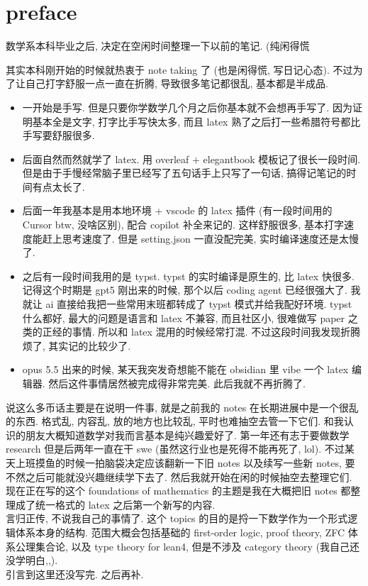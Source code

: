 \chapter*{preface}

数学系本科毕业之后, 决定在空闲时间整理一下以前的笔记. (纯闲得慌

其实本科刚开始的时候就热衷于 note taking 了 (也是闲得慌, 写日记心态). 不过为了让自己打字舒服一点一直在折腾, 导致很多笔记都很乱, 基本都是半成品. 
\begin{itemize}
    \item 一开始是手写. 但是只要你学数学几个月之后你基本就不会想再手写了. 因为证明基本全是文字, 打字比手写快太多, 而且 latex 熟了之后打一些希腊符号都比手写要舒服很多.
    \item 后面自然而然就学了 latex. 用 overleaf + elegantbook 模板记了很长一段时间. 但是由于手慢经常脑子里已经写了五句话手上只写了一句话, 搞得记笔记的时间有点太长了.
    \item 后面一年我基本是用本地环境 + vscode 的 latex 插件 (有一段时间用的 Cursor btw, 没啥区别), 配合 copilot 补全来记的. 这样舒服很多, 基本打字速度能赶上思考速度了. 但是 setting.json 一直没配完美, 实时编译速度还是太慢了. 
    \item 之后有一段时间我用的是 typst. typst 的实时编译是原生的, 比 latex 快很多. 记得这个时期是 gpt5 刚出来的时候, 那个以后 coding agent 已经很强大了. 我就让 ai 直接给我把一些常用末班都转成了 typst 模式并给我配好环境. typst 什么都好, 最大的问题是语言和 latex 不兼容, 而且社区小, 很难做写 paper 之类的正经的事情. 所以和 latex 混用的时候经常打混. 不过这段时间我发现折腾烦了, 其实记的比较少了. 
    \item opus 5.5 出来的时候, 某天我突发奇想能不能在 obsidian 里 vibe 一个 latex 编辑器. 然后这件事情居然被完成得非常完美. 此后我就不再折腾了. 
\end{itemize}
说这么多币话主要是在说明一件事, 就是之前我的 notes 在长期进展中是一个很乱的东西. 格式乱, 内容乱, 放的地方也比较乱, 平时也难抽空去管一下它们. 和我认识的朋友大概知道数学对我而言基本是纯兴趣爱好了. 第一年还有志于要做数学 research 但是后两年一直在干 swe (虽然这行业也是死得不能再死了, lol). 不过某天上班摸鱼的时候一拍脑袋决定应该翻新一下旧 notes 以及续写一些新 notes, 要不然之后可能就没兴趣继续学下去了. 然后我就开始在闲的时候抽空去整理它们. 现在正在写的这个 foundations of mathematics 的主题是我在大概把旧 notes 都整理成了统一格式的 latex 之后第一个新写的内容. \\

言归正传, 不说我自己的事情了. 这个 topics 的目的是捋一下数学作为一个形式逻辑体系本身的结构. 范围大概会包括基础的 first-order logic, proof theory, ZFC 体系公理集合论, 以及 type theory for lean4, 但是不涉及 category theory (我自己还没学明白,,). \\

引言到这里还没写完. 之后再补.

